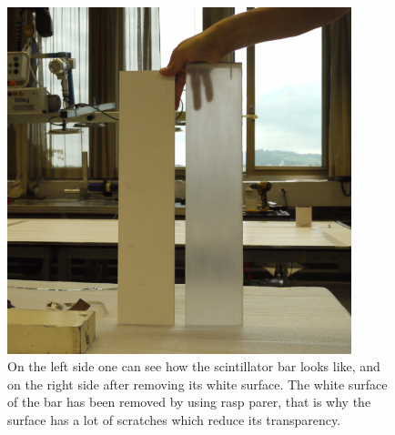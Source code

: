 \documentclass[a4paper]{article}\linespread{1.4}
\begin{document}
\begin{figure}[h!] \centering \includegraphics[width=100mm,scale=1.0]{figures/trapaint.png} \caption{On the left side one can see how the scintillator bar looks like, and on the right side after removing its white surface. The white surface of the bar has been removed by using rasp parer, that is why the surface has a lot of scratches which reduce its transparency.} \label{fig:trans} \end{figure}  
\end{document}

